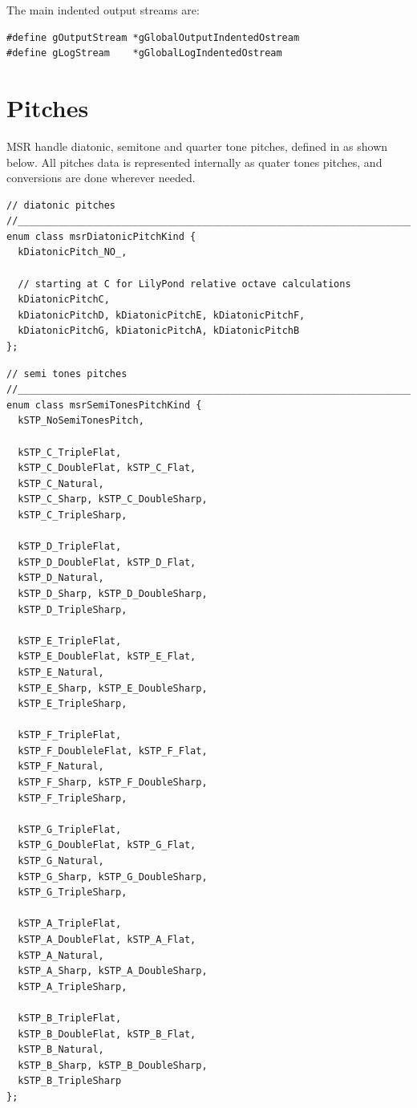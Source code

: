 The main indented output streams are:
\begin{lstlisting}[language=CPlusPlus]
#define gOutputStream *gGlobalOutputIndentedOstream
#define gLogStream    *gGlobalLogIndentedOstream

\end{lstlisting}


\section{Pitches}\label{Pitches}

MSR handle diatonic, semitone and quarter tone pitches, defined in  as shown below.
All pitches data is represented internally as quater tones pitches, and conversions are done wherever needed.

\begin{lstlisting}[language=CPlusPlus]
// diatonic pitches
//______________________________________________________________________________
enum class msrDiatonicPitchKind {
  kDiatonicPitch_NO_,

  // starting at C for LilyPond relative octave calculations
  kDiatonicPitchC,
  kDiatonicPitchD, kDiatonicPitchE, kDiatonicPitchF,
  kDiatonicPitchG, kDiatonicPitchA, kDiatonicPitchB
};
\end{lstlisting}

\begin{lstlisting}[language=CPlusPlus]
// semi tones pitches
//______________________________________________________________________________
enum class msrSemiTonesPitchKind {
  kSTP_NoSemiTonesPitch,

  kSTP_C_TripleFlat,
  kSTP_C_DoubleFlat, kSTP_C_Flat,
  kSTP_C_Natural,
  kSTP_C_Sharp, kSTP_C_DoubleSharp,
  kSTP_C_TripleSharp,

  kSTP_D_TripleFlat,
  kSTP_D_DoubleFlat, kSTP_D_Flat,
  kSTP_D_Natural,
  kSTP_D_Sharp, kSTP_D_DoubleSharp,
  kSTP_D_TripleSharp,

  kSTP_E_TripleFlat,
  kSTP_E_DoubleFlat, kSTP_E_Flat,
  kSTP_E_Natural,
  kSTP_E_Sharp, kSTP_E_DoubleSharp,
  kSTP_E_TripleSharp,

  kSTP_F_TripleFlat,
  kSTP_F_DoubleleFlat, kSTP_F_Flat,
  kSTP_F_Natural,
  kSTP_F_Sharp, kSTP_F_DoubleSharp,
  kSTP_F_TripleSharp,

  kSTP_G_TripleFlat,
  kSTP_G_DoubleFlat, kSTP_G_Flat,
  kSTP_G_Natural,
  kSTP_G_Sharp, kSTP_G_DoubleSharp,
  kSTP_G_TripleSharp,

  kSTP_A_TripleFlat,
  kSTP_A_DoubleFlat, kSTP_A_Flat,
  kSTP_A_Natural,
  kSTP_A_Sharp, kSTP_A_DoubleSharp,
  kSTP_A_TripleSharp,

  kSTP_B_TripleFlat,
  kSTP_B_DoubleFlat, kSTP_B_Flat,
  kSTP_B_Natural,
  kSTP_B_Sharp, kSTP_B_DoubleSharp,
  kSTP_B_TripleSharp
};
\end{lstlisting}

